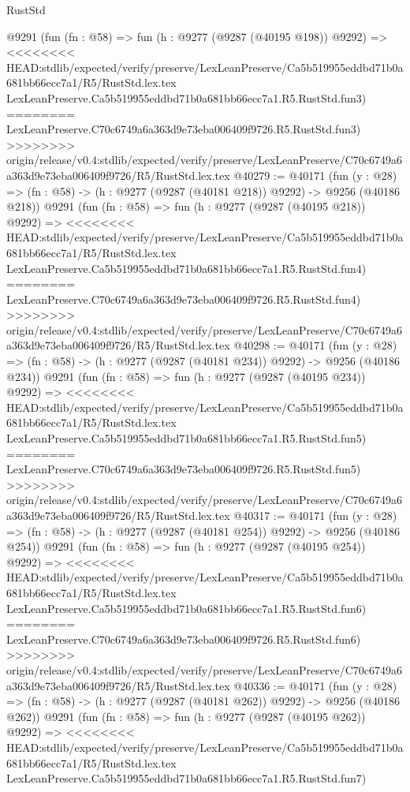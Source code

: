 \begin{lexlean}{RustStd}
\begin{coremodule}
{\begin{coremodule}
{{{{{{{{{{{{{{{{{{{{{{{{{{{{{{{{{{{{{{{{{{{{{{{{{{{{{{{    @9291
    (fun (fn : @58) =>
    fun (h : @9277 (@9287 (@40195 @198)) @9292) =>
<<<<<<<< HEAD:stdlib/expected/verify/preserve/LexLeanPreserve/Ca5b519955eddbd71b0a681bb66ecc7a1/R5/RustStd.lex.tex
    LexLeanPreserve.Ca5b519955eddbd71b0a681bb66ecc7a1.R5.RustStd.fun3)
========
    LexLeanPreserve.C70c6749a6a363d9e73eba006409f9726.R5.RustStd.fun3)
>>>>>>>> origin/release/v0.4:stdlib/expected/verify/preserve/LexLeanPreserve/C70c6749a6a363d9e73eba006409f9726/R5/RustStd.lex.tex
@40279 := @40171
    (fun (y : @28) => (fn : @58) -> (h : @9277 (@9287 (@40181 @218)) @9292) -> @9256 (@40186 @218))
    @9291
    (fun (fn : @58) =>
    fun (h : @9277 (@9287 (@40195 @218)) @9292) =>
<<<<<<<< HEAD:stdlib/expected/verify/preserve/LexLeanPreserve/Ca5b519955eddbd71b0a681bb66ecc7a1/R5/RustStd.lex.tex
    LexLeanPreserve.Ca5b519955eddbd71b0a681bb66ecc7a1.R5.RustStd.fun4)
========
    LexLeanPreserve.C70c6749a6a363d9e73eba006409f9726.R5.RustStd.fun4)
>>>>>>>> origin/release/v0.4:stdlib/expected/verify/preserve/LexLeanPreserve/C70c6749a6a363d9e73eba006409f9726/R5/RustStd.lex.tex
@40298 := @40171
    (fun (y : @28) => (fn : @58) -> (h : @9277 (@9287 (@40181 @234)) @9292) -> @9256 (@40186 @234))
    @9291
    (fun (fn : @58) =>
    fun (h : @9277 (@9287 (@40195 @234)) @9292) =>
<<<<<<<< HEAD:stdlib/expected/verify/preserve/LexLeanPreserve/Ca5b519955eddbd71b0a681bb66ecc7a1/R5/RustStd.lex.tex
    LexLeanPreserve.Ca5b519955eddbd71b0a681bb66ecc7a1.R5.RustStd.fun5)
========
    LexLeanPreserve.C70c6749a6a363d9e73eba006409f9726.R5.RustStd.fun5)
>>>>>>>> origin/release/v0.4:stdlib/expected/verify/preserve/LexLeanPreserve/C70c6749a6a363d9e73eba006409f9726/R5/RustStd.lex.tex
@40317 := @40171
    (fun (y : @28) => (fn : @58) -> (h : @9277 (@9287 (@40181 @254)) @9292) -> @9256 (@40186 @254))
    @9291
    (fun (fn : @58) =>
    fun (h : @9277 (@9287 (@40195 @254)) @9292) =>
<<<<<<<< HEAD:stdlib/expected/verify/preserve/LexLeanPreserve/Ca5b519955eddbd71b0a681bb66ecc7a1/R5/RustStd.lex.tex
    LexLeanPreserve.Ca5b519955eddbd71b0a681bb66ecc7a1.R5.RustStd.fun6)
========
    LexLeanPreserve.C70c6749a6a363d9e73eba006409f9726.R5.RustStd.fun6)
>>>>>>>> origin/release/v0.4:stdlib/expected/verify/preserve/LexLeanPreserve/C70c6749a6a363d9e73eba006409f9726/R5/RustStd.lex.tex
@40336 := @40171
    (fun (y : @28) => (fn : @58) -> (h : @9277 (@9287 (@40181 @262)) @9292) -> @9256 (@40186 @262))
    @9291
    (fun (fn : @58) =>
    fun (h : @9277 (@9287 (@40195 @262)) @9292) =>
<<<<<<<< HEAD:stdlib/expected/verify/preserve/LexLeanPreserve/Ca5b519955eddbd71b0a681bb66ecc7a1/R5/RustStd.lex.tex
    LexLeanPreserve.Ca5b519955eddbd71b0a681bb66ecc7a1.R5.RustStd.fun7)
}}}}}}}}}}}}}}}}}}}}}}}}}}}}}}}}}}}}}}}}}}}}}}}}}}}}}}}
\end{coremodule}}
\end{coremodule}
\end{lexlean}
